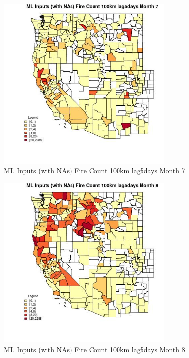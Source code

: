 \clearpage 

\begin{figure} 
\centering  
\includegraphics[width=0.77\textwidth]{Code_Outputs/Report_ML_input_PM25_Step4_part_e_de_duplicated_aves_compiled_2019-05-20wNAs_CountyFire_Count_100km_lag5daysmedianMonth7.jpg} 
\caption{\label{fig:Report_ML_input_PM25_Step4_part_e_de_duplicated_aves_compiled_2019-05-20wNAsCountyFire_Count_100km_lag5daysmedianMonth7}ML Inputs (with NAs) Fire Count 100km lag5days Month 7} 
\end{figure} 
 

\begin{figure} 
\centering  
\includegraphics[width=0.77\textwidth]{Code_Outputs/Report_ML_input_PM25_Step4_part_e_de_duplicated_aves_compiled_2019-05-20wNAs_CountyFire_Count_100km_lag5daysmedianMonth8.jpg} 
\caption{\label{fig:Report_ML_input_PM25_Step4_part_e_de_duplicated_aves_compiled_2019-05-20wNAsCountyFire_Count_100km_lag5daysmedianMonth8}ML Inputs (with NAs) Fire Count 100km lag5days Month 8} 
\end{figure} 
 

